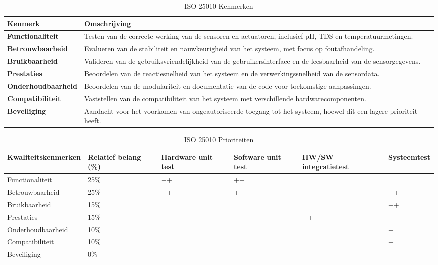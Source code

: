 \documentclass[a4paper]{report}
\begin{document}
\begin{table}[h]
  \centering
  \begin{tabularx}{\textwidth}{|l|X|}
    \hline
    \textbf{Kenmerk} & \textbf{Omschrijving} \\
    \hline 
    \textbf{Functionaliteit} & Testen van de correcte werking van de sensoren en actuatoren, inclusief pH, TDS en temperatuurmetingen. \\ 
    \hline
    \textbf{Betrouwbaarheid} & Evalueren van de stabiliteit en nauwkeurigheid van het systeem, met focus op foutafhandeling. \\ 
    \hline
    \textbf{Bruikbaarheid} & Valideren van de gebruiksvriendelijkheid van de gebruikersinterface en de leesbaarheid van de sensorgegevens. \\ 
    \hline
    \textbf{Prestaties} & Beoordelen van de reactiesnelheid van het systeem en de verwerkingssnelheid van de sensordata. \\
    \hline
    \textbf{Onderhoudbaarheid} & Beoordelen van de modulariteit en documentatie van de code voor toekomstige aanpassingen. \\
    \hline
    \textbf{Compatibiliteit} & Vaststellen van de compatibiliteit van het systeem met verschillende hardwarecomponenten. \\
    \hline
    \textbf{Beveiliging} & Aandacht voor het voorkomen van ongeautoriseerde toegang tot het systeem, hoewel dit een lagere prioriteit heeft. \\
    \hline
  \end{tabularx}
  \caption{ISO 25010 Kenmerken}
  \label{tab:25010_specs}
\end{table}



\begin{table}[h]
  \centering
  \begin{tabularx}{\textwidth}{|l|X|X|X|X|X|}
    \hline
    \textbf{Kwaliteitskenmerken} & \textbf{Relatief \newline belang \newline (\%)} & \textbf{Hardware \newline unit test} & \textbf{Software \newline unit test} & \textbf{HW/SW \newline integratietest} & \textbf{Systeemtest} \\
    \hline 
    Functionaliteit & 25\% & ++ & ++ &  &  \\ 
    \hline
    Betrouwbaarheid & 25\% & ++ & ++ &  & ++ \\ 
    \hline
    Bruikbaarheid & 15\% &  &  &  & ++ \\ 
    \hline
    Prestaties & 15\% &  &  & ++ &  \\ 
    \hline
    Onderhoudbaarheid & 10\% &  &  &  & + \\ 
    \hline
    Compatibiliteit & 10\% &  &  &  & + \\ 
    \hline
    Beveiliging & 0\% &  &  &  &  \\ 
    \hline
  \end{tabularx}
  \caption{ISO 25010 Prioriteiten}
  \label{tab:25010_priorities}
\end{table}
\end{document}
